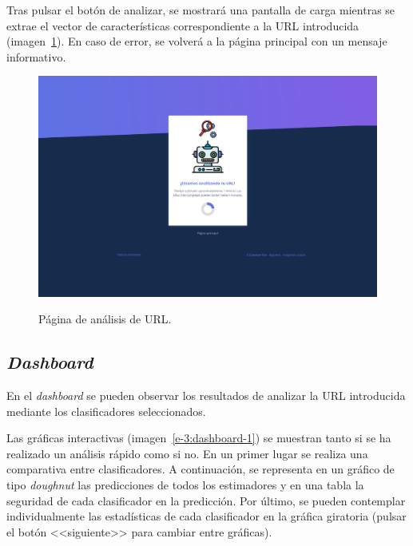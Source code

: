 Tras pulsar el botón de analizar, se mostrará una pantalla de carga mientras se extrae el vector de características correspondiente a la URL introducida (imagen~\ref{e-1:analysis}). En caso de error, se volverá a la página principal con un mensaje informativo.

\begin{figure}[h]
	\caption[Manual de usuario: página de carga]{Página de análisis de URL.}
	\centering
	\includegraphics[width=\textwidth]{../img/anexos/user_guide/2_analysis}
	\label{e-1:analysis}
\end{figure}

\subsection{\textit{Dashboard}}
\label{s-e:dashboard}

En el \textit{dashboard} se pueden observar los resultados de analizar la URL introducida mediante los clasificadores seleccionados.

Las gráficas interactivas (imagen~\ref{e-3:dashboard-1}) se muestran tanto si se ha realizado un análisis rápido como si no. En un primer lugar se realiza una comparativa entre clasificadores. A continuación, se representa en un gráfico de tipo \textit{doughnut} las predicciones de todos los estimadores y en una tabla la seguridad de cada clasificador en la predicción. Por último, se pueden contemplar individualmente las estadísticas de cada clasificador en la gráfica giratoria (pulsar el botón <<siguiente>> para cambiar entre gráficas).

